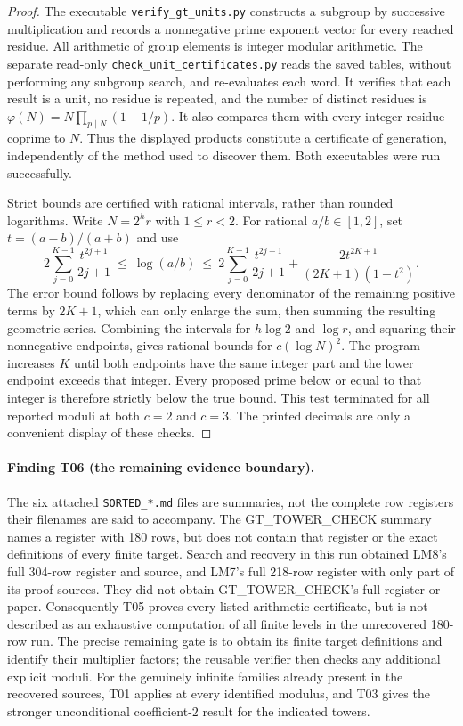 \begin{proof}
The executable \texttt{verify\_gt\_units.py} constructs a subgroup by
successive multiplication and records a nonnegative prime exponent
vector for every reached residue. All arithmetic of group elements is
integer modular arithmetic. The separate read-only
\texttt{check\_unit\_certificates.py} reads the saved tables, without
performing any subgroup search, and re-evaluates each word. It verifies
that each result is a unit, no residue is repeated, and the number
of distinct residues is
$\varphi(N)=N\prod_{p\mid N}(1-1/p)$. It also compares them with
every integer residue coprime to $N$. Thus the displayed products
constitute a certificate of generation, independently of the method
used to discover them. Both executables were run successfully.

Strict bounds are certified with rational intervals, rather than
rounded logarithms. Write $N=2^h r$ with $1\leq r<2$. For rational
$a/b\in[1,2]$, set $t=(a-b)/(a+b)$ and use
\[
 2\sum_{j=0}^{K-1}\frac{t^{2j+1}}{2j+1}
 \ \leq\ \log(a/b)\ \leq\
 2\sum_{j=0}^{K-1}\frac{t^{2j+1}}{2j+1}
       +\frac{2t^{2K+1}}{(2K+1)(1-t^2)}.
 \tag{T05.1}
\]
The error bound follows by replacing every denominator of the
remaining positive terms by $2K+1$, which can only enlarge the sum,
then summing the resulting geometric series. Combining the
intervals for $h\log2$ and $\log r$, and squaring their nonnegative
endpoints, gives rational bounds for $c(\log N)^2$. The program
increases $K$ until both endpoints have the same integer part and
the lower endpoint exceeds that integer. Every proposed prime below
or equal to that integer is therefore strictly below the true bound.
This test terminated for all reported moduli at both $c=2$ and $c=3$.
The printed decimals are only a convenient display of these checks.
\end{proof}



\paragraph{Finding T06 (the remaining evidence boundary).}
The six attached \texttt{SORTED\_*.md} files are summaries, not the
complete row registers their filenames are said to accompany. The
GT\_TOWER\_CHECK summary names a register with 180 rows, but does not
contain that register or the exact definitions of every finite target.
Search and recovery in this run obtained LM8's full 304-row register
and source, and LM7's full 218-row register with only part of its proof
sources. They did not obtain GT\_TOWER\_CHECK's full register or paper.
Consequently T05 proves every listed arithmetic certificate, but is
not described as an exhaustive computation of all finite levels in
the unrecovered 180-row run. The precise remaining gate is to obtain
its finite target definitions and identify their multiplier factors;
the reusable verifier then checks any additional explicit moduli.
For the genuinely infinite families already present in the recovered
sources, T01 applies at every identified modulus, and T03 gives the
stronger unconditional coefficient-$2$ result for the indicated towers.

